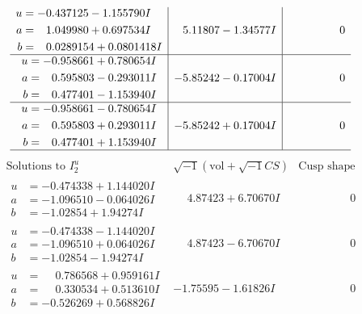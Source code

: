 \documentclass[1p]{elsarticle_modified}
\theoremstyle{definition}
\newcommand{\I}{\sqrt{-1}}
\begin{document}
$$\begin{array}{c|c|c}
\begin{aligned}
u &= -0.437125 - 1.155790 I \\
a &= \phantom{-}1.049980 + 0.697534 I \\
b &= \phantom{-}0.0289154 + 0.0801418 I\end{aligned}
 & \phantom{-}5.11807 - 1.34577 I & \phantom{-0.000000 } 0 \\ \hline\begin{aligned}
u &= -0.958661 + 0.780654 I \\
a &= \phantom{-}0.595803 - 0.293011 I \\
b &= \phantom{-}0.477401 - 1.153940 I\end{aligned}
 & -5.85242 - 0.17004 I & \phantom{-0.000000 } 0 \\ \hline\begin{aligned}
u &= -0.958661 - 0.780654 I \\
a &= \phantom{-}0.595803 + 0.293011 I \\
b &= \phantom{-}0.477401 + 1.153940 I\end{aligned}
 & -5.85242 + 0.17004 I & \phantom{-0.000000 } 0\\
 \hline 
 \end{array}$$\newpage$$\begin{array}{c|c|c}  
\text{Solutions to }I^u_{2}& \I (\text{vol} + \sqrt{-1}CS) & \text{Cusp shape}\\
 \hline 
\begin{aligned}
u &= -0.474338 + 1.144020 I \\
a &= -1.096510 - 0.064026 I \\
b &= -1.02854 + 1.94274 I\end{aligned}
 & \phantom{-}4.87423 + 6.70670 I & \phantom{-0.000000 } 0 \\ \hline\begin{aligned}
u &= -0.474338 - 1.144020 I \\
a &= -1.096510 + 0.064026 I \\
b &= -1.02854 - 1.94274 I\end{aligned}
 & \phantom{-}4.87423 - 6.70670 I & \phantom{-0.000000 } 0 \\ \hline\begin{aligned}
u &= \phantom{-}0.786568 + 0.959161 I \\
a &= \phantom{-}0.330534 + 0.513610 I \\
b &= -0.526269 + 0.568826 I\end{aligned}
 & -1.75595 - 1.61826 I & \phantom{-0.000000 } 0 \\ \hline\begin{aligned}

\end{aligned}
\end{array}$$
\end{document}
